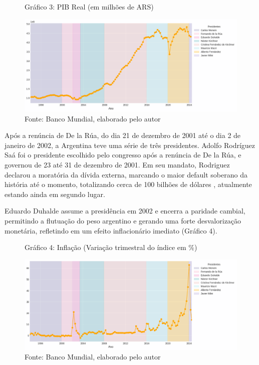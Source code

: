 \documentclass[a4paper, 12pt, openany, oneside, brazil]{abntex2}
\begin{document}
\begin{figure}[h!]
	\caption*{Gráfico 3: PIB Real (em milhões de ARS)}
	\includegraphics[width=\textwidth]{dados/pib_real}
	\caption*{Fonte: Banco Mundial, elaborado pelo autor}
\end{figure}

Após a renúncia de De la Rúa, do dia 21 de dezembro de 2001 até o dia 2 de janeiro de 2002, a Argentina teve uma série de três presidentes. Adolfo Rodríguez Saá foi o presidente escolhido pelo congresso após a renúncia de De la Rúa, e governou de 23 até 31 de dezembro de 2001. Em seu mandato, Rodriguez declarou a moratória da dívida externa, marcando o maior default soberano da história até o momento, totalizando cerca de 100 bilhões de dólares \cite{IMFArgentina2004}, atualmente estando ainda em segundo lugar.

Eduardo Duhalde assume a presidência em 2002 e encerra a paridade cambial, permitindo a flutuação do peso argentino e gerando uma forte desvalorização monetária, refletindo em um efeito inflacionário imediato (Gráfico 4).

\begin{figure}[h!]
	\caption*{Gráfico 4: Inflação (Variação trimestral do índice em \%)}
	\includegraphics[width=\textwidth]{dados/inflacao}
	\caption*{Fonte: Banco Mundial, elaborado pelo autor}
\end{figure}
\end{document}

